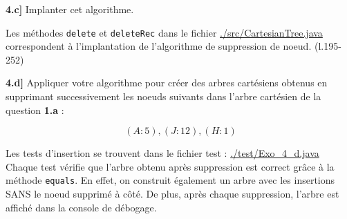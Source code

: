 \documentclass[a4paper,12pt]{report}
\begin{document}

\vspace{1.5cm}

\textbf{4.c]} Implanter cet algorithme.



\begin{tcolorbox}[colback=gray!10, colframe=blue!30, coltitle=black, title=Réponse à la 4.c - 1/1]

    Les méthodes \texttt{delete} et \texttt{deleteRec} dans le fichier \href{./src/CartesianTree.java}{./src/CartesianTree.java} correspondent à 
        l'implantation de l'algorithme de suppression de noeud. (l.195-252)

\end{tcolorbox}




\vspace{1.5cm}

\textbf{4.d]} Appliquer votre algorithme pour créer des arbres cartésiens obtenus en supprimant successivement les noeuds suivants dans l'arbre cartésien
    de la question \textbf{1.a} :

\[
\ (A:5), (J:12), (H:1)
\]



\begin{tcolorbox}[colback=gray!10, colframe=blue!30, coltitle=black, title=Réponse à la 4.d - 1/1]

    Les tests d'insertion se trouvent dans le fichier test : \href{./test/Exo\_4\_d.java}{./test/Exo\_4\_d.java}\\

    Chaque test vérifie que l'arbre obtenu après suppression est correct grâce à la méthode \texttt{equals}. En effet, on construit également
        un arbre avec les insertions SANS le noeud supprimé à côté. De plus, après chaque suppression, l'arbre est affiché dans la console
        de débogage.

\end{tcolorbox}
\end{document}

